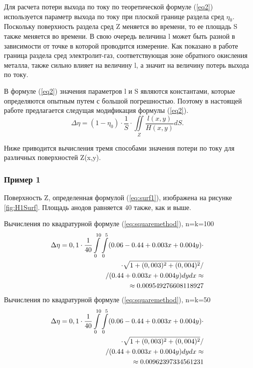 \documentclass{article}
\begin{document}
Для расчета потери выхода по току по теоретической формуле (\ref{eq2}) используется параметр выхода по току при плоской границе раздела сред $\eta_0$. Поскольку поверхность раздела сред Z меняется во времени, то ее площадь S также меняется во времени. В свою очередь величина l может быть разной в зависимости от точке в которой проводится измерение. Как показано в работе \cite{litlink:kalmykov} граница раздела  сред электролит-газ, соответствующая зоне обратного окисления металла, также сильно влияет на величину l, а значит на величину потерь выхода по току.

В формуле (\ref{eq2}) значения параметров l и S являются константами, которые определяются опытным путем с большой погрешностью. Поэтому в настоящей работе предлагается следущая модификация формулы (\ref{eq2}).
\begin{equation} \label{eq:modeq2}
\Delta \eta = (1- \eta_0) \cdot \frac{1}{S} \cdot \iint\limits_Z \frac{l(x,y)}{H(x,y)}dS.
\end{equation}

Ниже приводится вычисления тремя способами значения потери по току для различных поверхностей Z(x,y).

\subsubsection*{Пример 1}

Поверхность Z, определенная формулой (\ref{eq:surf1}), изображена на рисунке \ref{fig:H1Surf}. Площадь анодов равняется $40$ также, как и выше.

Вычисления по квадратурной формуле (\ref{eq:squaremethod}), n=k=100
\begin{align}
\Delta \eta = 0,1 \cdot \frac{1}{40} \int\limits_0^{10} \int\limits_0^5 (0.06 - 0.44 + 0.003x + 0.004y) \cdot \notag \\
\cdot \sqrt{1+(0,003)^2+(0,004)^2}/ \notag \\ 
/(0.44 + 0.003x + 0.004y) dy dx \approx \notag \\ \approx 0.009549276608118927
\end{align}
Вычисления по квадратурной формуле (\ref{eq:squaremethod}), n=k=50
\begin{align}
\Delta \eta = 0,1 \cdot \frac{1}{40} \int\limits_0^{10} \int\limits_0^5 (0.06 - 0.44 + 0.003x + 0.004y) \cdot \notag \\
\cdot \sqrt{1+(0,003)^2+(0,004)^2}/ \notag \\ 
/(0.44 + 0.003x + 0.004y) dy dx \approx \notag \\ \approx 0.00962397334561231
\end{align}
\end{document}
